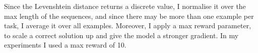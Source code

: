 Since the Levenshtein distance returns a discrete value, I normalise it over the max length of the sequences, and since there may be more than one example per task, I average it over all examples. Moreover, I apply a max reward parameter, to scale a correct solution up and give the model a stronger gradient. In my experiments I used a max reward of 10.











































































































